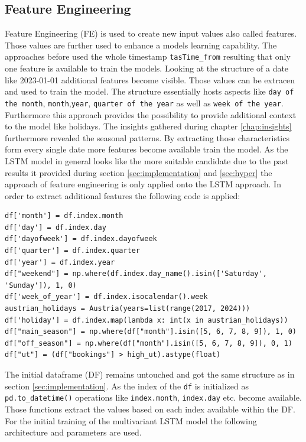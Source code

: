 \subsection{Feature Engineering}
\label{sec:feature_eng}
Feature Engineering (FE) is used to create new input values also called features. Those values are further used to enhance a models learning capability. \cite{feature_eng_2} The approaches before used the whole timestamp \verb|tasTime_from| resulting that only one feature is available to train the models.  
Looking at the structure of a date like 2023-01-01 additional features become visible. Those values can be extracen and used to train the model.  The structure essentially hosts aspects like \verb|day of the month|, \verb|month|,\verb|year|, \verb|quarter of the year| as well as \verb|week of the year|. Furthermore this approach provides the possibility to provide additional context to the model like holidays. The insights gathered during chapter \ref{chap:insights} furthermore revealed the seasonal patterns. By extracting those characteristics form every single date more features become available train the model. As the LSTM model in general looks like the more suitable candidate due to the past results it provided during section \ref{sec:implementation} and \ref{sec:hyper} the approach of feature engineering is only applied onto the LSTM approach.
\newline
In order to extract additional features the following code is applied: 
\begin{lstlisting}
df['month'] = df.index.month
df['day'] = df.index.day
df['dayofweek'] = df.index.dayofweek
df['quarter'] = df.index.quarter
df['year'] = df.index.year
df["weekend"] = np.where(df.index.day_name().isin(['Saturday', 'Sunday']), 1, 0)
df['week_of_year'] = df.index.isocalendar().week
austrian_holidays = Austria(years=list(range(2017, 2024)))
df['holiday'] = df.index.map(lambda x: int(x in austrian_holidays))
df["main_season"] = np.where(df["month"].isin([5, 6, 7, 8, 9]), 1, 0)
df["off_season"] = np.where(df["month"].isin([5, 6, 7, 8, 9]), 0, 1)
df["ut"] = (df["bookings"] > high_ut).astype(float)
\end{lstlisting}
The initial dataframe (DF) remains untouched and got the same structure as in section \ref{sec:implementation}. As the index of the \verb|df| is initialized as \verb|pd.to_datetime()| operations like \verb|index.month|, \verb|index.day| etc. become available. Those functions extract the values based on each index available  within the DF. 
For the initial training of the multivariant LSTM model the following architecture and parameters are used. 
